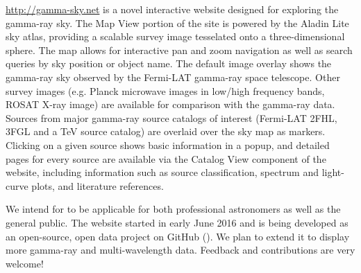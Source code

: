 \url{http://gamma-sky.net} is a novel interactive website designed for exploring the gamma-ray sky. The Map View portion of the site is powered by the Aladin Lite sky atlas, providing a scalable survey image tesselated onto a three-dimensional sphere. The map allows for interactive pan and zoom navigation as well as search queries by sky position or object name. The default image overlay shows the gamma-ray sky observed by the Fermi-LAT gamma-ray space telescope. Other survey images (e.g. Planck microwave images in low/high frequency bands, ROSAT X-ray image) are available for comparison with the gamma-ray data.
Sources from major gamma-ray source catalogs of interest (Fermi-LAT 2FHL, 3FGL and a TeV source catalog) are overlaid over the sky map as markers. Clicking on a given source shows basic information in a popup, and detailed pages for every source are available via the Catalog View component of the website, including information such as source classification, spectrum and light-curve plots, and literature references.

We intend for \gammasky to be applicable for both professional astronomers as well as the general public. The website started in early June 2016 and is being developed as an open-source, open data project on GitHub (\gammaskygh). We plan to extend it to display more gamma-ray and multi-wavelength data. Feedback and contributions are very welcome!
